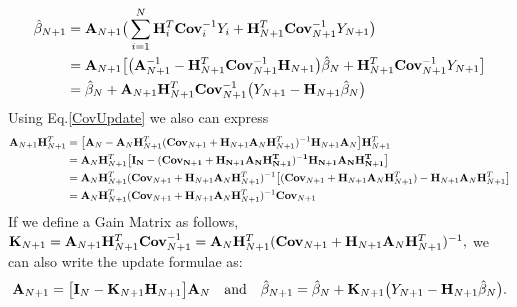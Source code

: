 \begin{align*}\hat{\beta}_{N+1} &= {\bf A}_{N+1} \big( \sum_{i=1}^{N} {\bf H}_i^T {\bf Cov}_i^{-1} Y_i  + {\bf H}_{N+1}^T {\bf Cov}_{N+1}^{-1} Y_{N+1}\big)\\
                                                 &= {\bf A}_{N+1} \big[\big({\bf A}_{N+1}^{-1} - {\bf H}_{N+1}^T {\bf Cov}_{N+1}^{-1} {\bf H}_{N+1} \big) \hat{\beta}_N + {\bf H}_{N+1}^T {\bf Cov}_{N+1}^{-1} Y_{N+1}\big]\\
                                                 &= \hat{\beta}_N + {\bf A}_{N+1}{\bf H}_{N+1}^T {\bf Cov}_{N+1}^{-1}  \big( Y_{N+1} -  {\bf H}_{N+1} \hat{\beta}_N \big)\end{align*}Using Eq.\eqref{CovUpdate} we also can express
\begin{align*} {\bf A}_{N+1}{\bf H}_{N+1}^T &= \big[{\bf A}_N - {\bf A}_N{\bf H}_{N+1}^T({\bf Cov}_{N+1} + {\bf H}_{N+1}{\bf A}_N{\bf H}_{N+1}^T)^{-1}{\bf H}_{N+1}{\bf A}_N\big] {\bf H}_{N+1}^T\\
                                                                    &= {\bf A}_N{\bf H}_{N+1}^T \big[ \bf{I}_N - ({\bf Cov}_{N+1} + {\bf H}_{N+1}{\bf A}_N{\bf H}_{N+1}^T)^{-1}{\bf H}_{N+1}{\bf A}_N {\bf H}_{N+1}^T\big]\\
                                                                    &= {\bf A}_N{\bf H}_{N+1}^T ({\bf Cov}_{N+1} + {\bf H}_{N+1}{\bf A}_N{\bf H}_{N+1}^T)^{-1}\big[ ({\bf Cov}_{N+1} + {\bf H}_{N+1}{\bf A}_N{\bf H}_{N+1}^T) -  {\bf H}_{N+1}{\bf A}_N {\bf H}_{N+1}^T\big]\\
                                                                    &= {\bf A}_N{\bf H}_{N+1}^T ({\bf Cov}_{N+1} + {\bf H}_{N+1}{\bf A}_N{\bf H}_{N+1}^T)^{-1}{\bf Cov}_{N+1}
                                                                    \end{align*}
If we define a Gain Matrix as follows, ${\bf K}_{N+1} = {\bf A}_{N+1} {\bf H}^T_{N+1}{\bf Cov}^{-1}_{N+1}= {\bf A}_N{\bf H}_{N+1}^T({\bf Cov}_{N+1} + {\bf H}_{N+1}{\bf A}_N{\bf H}_{N+1}^T)^{-1},$ we can also write the update formulae as: $${\bf A}_{N+1} =  \big[ {\bf I}_N - {\bf K}_{N+1}{\bf H}_{N+1}\big]{\bf A}_N  \quad\hbox{and}\quad  \hat{\bf \beta}_{N+1} = \hat{\beta}_N + {\bf K}_{N+1}  \big( Y_{N+1} -  {\bf H}_{N+1} \hat{\beta}_N \big).$$

 
